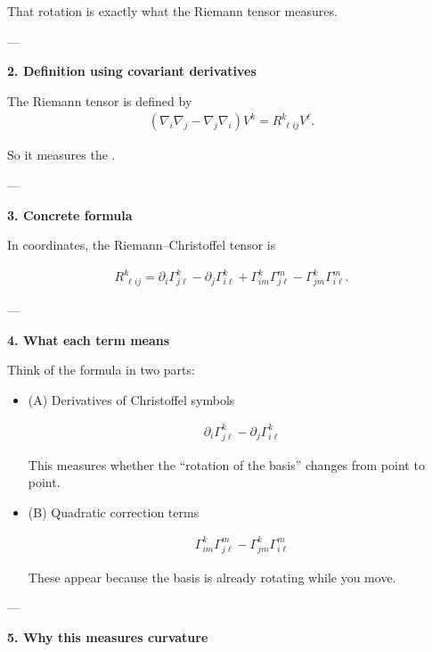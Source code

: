 \documentclass[12pt,a4paper]{report}
\begin{document}
\begin{description}
\begin{description}
That rotation is exactly what the Riemann tensor measures.

---

\item \textbf{2. Definition using covariant derivatives}

The Riemann tensor is defined by
\begin{align*}
(\nabla_i \nabla_j - \nabla_j \nabla_i)V^k = R^k_{\ \ell ij} V^\ell.
\end{align*}

So it measures the .

---

\item \textbf{3. Concrete formula}

In coordinates, the Riemann–Christoffel tensor is

\begin{align*}
R^k_{\ \ell ij} = \partial_i \Gamma^k_{j\ell} - \partial_j \Gamma^k_{i\ell} + \Gamma^k_{im}\Gamma^m_{j\ell} - \Gamma^k_{jm}\Gamma^m_{i\ell}.
\end{align*}

---

\item \textbf{4. What each term means}

Think of the formula in two parts:

\begin{itemize}
\item (A) Derivatives of Christoffel symbols

\begin{align*}
\partial_i \Gamma^k_{j\ell} - \partial_j \Gamma^k_{i\ell}
\end{align*}

This measures whether the “rotation of the basis” changes from point to point.

\item (B) Quadratic correction terms

\begin{align*}
\Gamma^k_{im}\Gamma^m_{j\ell} - \Gamma^k_{jm}\Gamma^m_{i\ell}
\end{align*}

These appear because the basis is already rotating while you move.
\end{itemize}

---

\item \textbf{5. Why this measures curvature}


\end{description}
\end{description}
\end{document}
